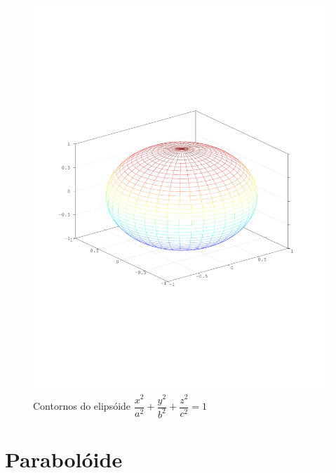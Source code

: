 \begin{figure}[!h]
	\centering
	\caption{Contornos do elipsóide $\dfrac{x^2}{a^2} + \dfrac{y^2}{b^2} + \dfrac{z^2}{c^2} = 1$}
	\includegraphics[scale=0.8]{quadricas/elipsoide-contornos.pdf}
\end{figure}


\section{Parabolóide} %
\label{sec:paraboloide}
\begin{definicao}
\end{definicao}

